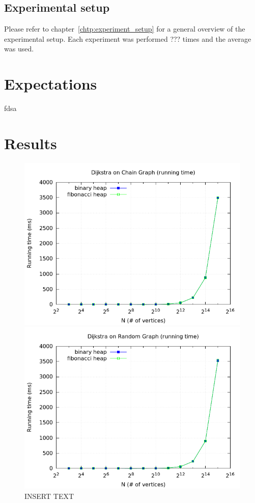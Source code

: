 \documentclass[a4paper,oneside,article,11pt]{memoir}
\begin{document}
\subsection{Experimental setup}
Please refer to chapter~\ref{chtp:experiment_setup} for a general overview of the experimental setup. Each experiment was performed ??? times and the average was used.

\section{Expectations}
fdsa

\section{Results}

\begin{figure}[H]
\centering
\begin{minipage}{0.48\columnwidth}
  \centering
  \includegraphics[width=\linewidth]{../res/dijkstra/d_chain_rt.png}%
  \caption{INSERT TEXT}
  \label{fig:delmin_2_random_branch}
\end{minipage}%
\hfill
\begin{minipage}{0.48\columnwidth}
  \centering
  \includegraphics[width=\linewidth]{../res/dijkstra/d_random_rt.png}%

\end{minipage}
\end{figure}
\end{document}

